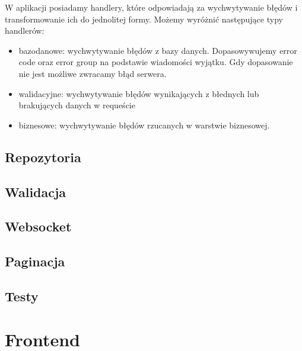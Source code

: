 W aplikacji posiadamy handlery, które odpowiadają za wychwytywanie błędów i transformowanie ich do jednolitej formy.
Możemy wyróżnić następujące typy handlerów:
\begin{itemize}
    \item bazodanowe: wychwytywanie błędów z bazy danych. Dopasowywujemy error code oraz error group na podstawie wiadomości wyjątku. Gdy dopasowanie nie
    jest możliwe zwracamy błąd serwera.
    \item walidacyjne: wychwytywanie błędów wynikających z błednych lub brakujących danych w requeście
    \item biznesowe: wychwytywanie błędów rzucanych w warstwie biznesowej.
\end{itemize}

\subsection{Repozytoria}

\subsection{Walidacja}

\subsection{Websocket}

\subsection{Paginacja}

\subsection{Testy}

\section{Frontend}

